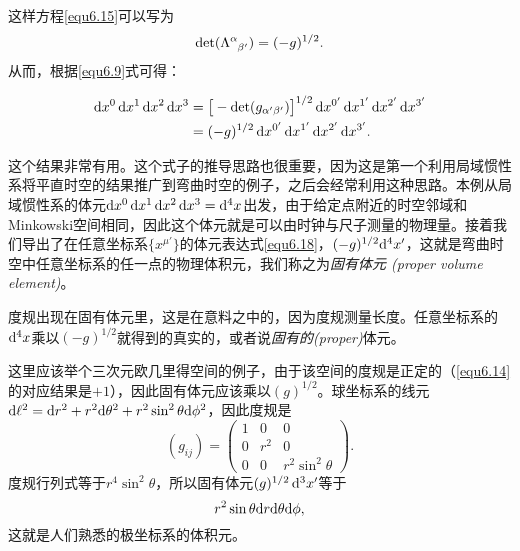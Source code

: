 这样方程\eqref{equ6.15}可以写为
\begin{equation}
    \det (\Lambda\indices{^\alpha_{\beta'}}) = (-g)^{1/2}.
\label{equ6.17}
\end{equation}
从而，根据\eqref{equ6.9}式可得：
\begin{shaded}
\begin{align}
    \mathrm{d} x^0\, \mathrm{d} x^1\, \mathrm{d} x^2\, \mathrm{d} x^3 &= \big[ -\det (g_{\alpha' \beta'}) \big]^{1/2} \, \mathrm{d} x^{0'}\, \mathrm{d} x^{1'}\, \mathrm{d} x^{2'}\, \mathrm{d} x^{3'} \notag \\
    &= (-g)^{1/2} \, \mathrm{d} x^{0'}\, \mathrm{d} x^{1'}\, \mathrm{d} x^{2'}\, \mathrm{d} x^{3'}. \label{equ6.18}
\end{align}
\end{shaded}
这个结果非常有用。这个式子的推导思路也很重要，因为这是第一个利用局域惯性系将平直时空的结果推广到弯曲时空的例子，之后会经常利用这种思路。本例从局域惯性系的体元$\mathrm{d} x^0\, \mathrm{d} x^1\, \mathrm{d} x^2\, \mathrm{d} x^3 = \mathrm{d}^4 x$出发，由于给定点附近的时空邻域和Minkowski空间相同，因此这个体元就是可以由时钟与尺子测量的物理量。接着我们导出了在任意坐标系$\{ x^{\mu'} \}$的体元表达式\eqref{equ6.18}，$(-g)^{1/2} \mathrm{d}^4 x'$，这就是弯曲时空中任意坐标系的任一点的物理体积元，我们称之为\textit{固有体元 (proper volume element)}。

度规出现在固有体元里，这是在意料之中的，因为度规测量长度。任意坐标系的$\mathrm{d}^4 x$乘以$(-g)^{1/2}$就得到的真实的，或者说\textit{固有的(proper)}体元。

这里应该举个三次元欧几里得空间的例子，由于该空间的度规是正定的（\eqref{equ6.14}的对应结果是$+1$），因此固有体元应该乘以$(g)^{1/2}$。球坐标系的线元$\mathrm{d} \ell^2 = \mathrm{d} r^2 + r^2 \mathrm{d} \theta^2 + r^2 \sin^2 \theta \mathrm{d} \phi^2$，因此度规是
\begin{equation}
    (g_{ij}) = 
    \begin{pmatrix}
        1 & 0 & 0 \\
        0 & r^2 & 0 \\
        0 & 0 & r^2 \sin^2 \theta
    \end{pmatrix}.
\label{equ6.19}
\end{equation}
度规行列式等于$r^4 \sin^2 \theta$，所以固有体元$(g)^{1/2} \, \mathrm{d}^3 x'$等于
\begin{equation}
    r^2 \sin \theta \mathrm{d} r \mathrm{d} \theta \mathrm{d} \phi,
\label{equ6.20}
\end{equation}
这就是人们熟悉的极坐标系的体积元。

